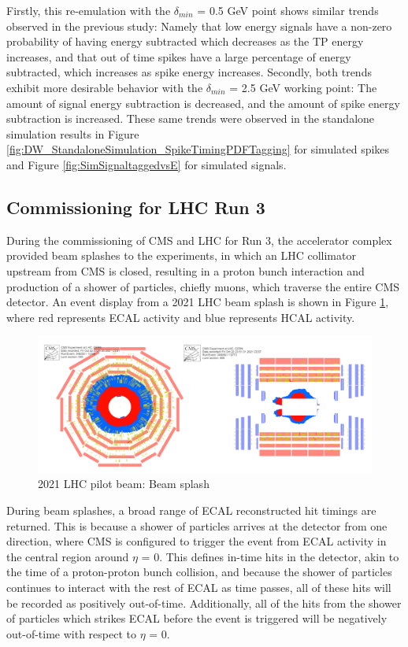 Firstly, this re-emulation with the $\delta_{min}$ = 0.5 GeV point shows similar trends observed in the previous study: Namely that low energy signals have a non-zero probability of having energy subtracted which decreases as the TP energy increases, and that out of time spikes have a large percentage of energy subtracted, which increases as spike energy increases. Secondly, both trends exhibit more desirable behavior with the $\delta_{min}$ = 2.5 GeV working point: The amount of signal energy subtraction is decreased, and the amount of spike energy subtraction is increased. These same trends were observed in the standalone simulation results in Figure \ref{fig:DW_StandaloneSimulation_SpikeTimingPDFTagging} for simulated spikes and Figure \ref{fig:SimSignaltaggedvsE} for simulated signals.

\subsection{Commissioning for LHC Run 3} \label{sec:ECALTrigger_Run3}

During the commissioning of CMS and LHC for Run 3, the accelerator complex provided beam splashes to the experiments, in which an LHC collimator upstream from CMS is closed, resulting in a proton bunch interaction and production of a shower of particles, chiefly muons, which traverse the entire CMS detector. An event display from a 2021 LHC beam splash is shown in Figure \ref{fig:2021PilotBeam_BeamSplash}, where red represents ECAL activity and blue represents HCAL activity. 

\begin{figure}[H]
    \centering
    \includegraphics[width=\textwidth]{Images/ECAL/DW/BeamSplash.png}
    \caption{2021 LHC pilot beam: Beam splash}
    \label{fig:2021PilotBeam_BeamSplash}
\end{figure}

During beam splashes, a broad range of ECAL reconstructed hit timings are returned. This is because a shower of particles arrives at the detector from one direction, where CMS is configured to trigger the event from ECAL activity in the central region around $\eta$ = 0. This defines in-time hits in the detector, akin to the time of a proton-proton bunch collision, and because the shower of particles continues to interact with the rest of ECAL as time passes, all of these hits will be recorded as positively out-of-time. Additionally, all of the hits from the shower of particles which strikes ECAL before the event is triggered will be negatively out-of-time with respect to $\eta$ = 0.  


